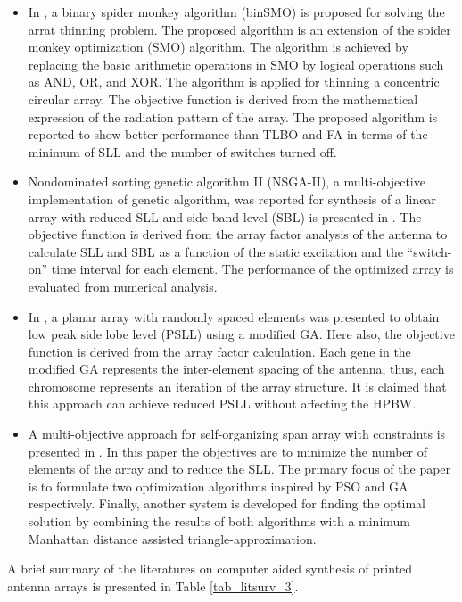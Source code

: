 \begin{itemize}
\item In \cite{arrayThin2}, a binary spider monkey algorithm (binSMO) is proposed for solving the arrat thinning problem. The proposed algorithm is an extension of the spider monkey optimization (SMO) algorithm. The algorithm is achieved by replacing the basic arithmetic operations in SMO by logical operations such as AND, OR, and XOR. The algorithm is applied for thinning a concentric circular array. The objective function is derived from the mathematical expression of the radiation pattern of the array. The proposed algorithm is reported to show better performance than TLBO and FA in terms of the minimum of SLL and the number of switches turned off.
\item Nondominated sorting genetic algorithm II (NSGA-II), a multi-objective implementation of genetic algorithm, was reported for synthesis of a linear array with reduced SLL and side-band level (SBL) is presented in \cite{arraySynth2}. The objective function is derived from the array factor analysis of the antenna to calculate SLL and SBL as a function of the static excitation and the ``switch-on'' time interval for each element. The performance of the optimized array is evaluated from numerical analysis.
\item In \cite{randomlySpacedArray}, a planar array with randomly spaced elements was presented to obtain low peak side lobe level (PSLL) using a modified GA. Here also, the objective function is derived from the array factor calculation. Each gene in the modified GA represents the inter-element spacing of the antenna, thus, each chromosome represents an iteration of the array structure. It is claimed that this approach can achieve reduced PSLL without affecting the HPBW.
\item A multi-objective approach for self-organizing span array with constraints is presented in \cite{selfOrgOpt}. In this paper the objectives are to minimize the number of elements of the array and to reduce the SLL. The primary focus of the paper is to formulate two optimization algorithms inspired by PSO and GA respectively. Finally, another system is developed for finding the optimal solution by combining the results of both algorithms with a minimum Manhattan distance assisted triangle-approximation.
\end{itemize}

A brief summary of the literatures on computer aided synthesis of printed antenna arrays is presented in Table \ref{tab_litsurv_3}.

